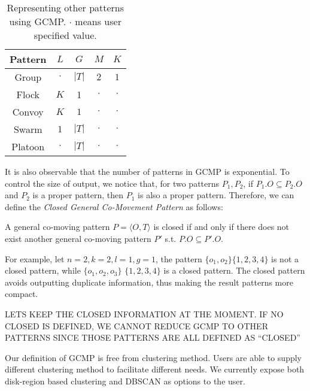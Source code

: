 \begin{table}
\centering
\begin{tabular}{|c|c|c|c|c|}
\hline 
Pattern & $L$ & $G$ & $M$ & $K$ \\ 
\hline
Group & $\cdot$ & $|T|$ & $2$ & $1$ \\
\hline
Flock & $K$ & 1 & $\cdot$ & $\cdot$ \\
\hline 
Convoy & $K$ & $1$ & $\cdot$ & $\cdot$\\ 
\hline 
Swarm & $1$ & $|T|$ & $\cdot$ & $\cdot$ \\ 
\hline 
Platoon & $\cdot$ & $|T|$ & $\cdot$ & $\cdot$\\ 
\hline 
\end{tabular} 
\caption{Representing other patterns using GCMP. $\cdot$ means user specified value.}
\label{tbl:patterns}
\end{table}
 
It is also observable that the number of patterns in GCMP is exponential. To control the size of output, 
we notice that, for two patterns $P_1,P_2$, if $P_1.O \subseteq P_2.O$ and $P_2$ is a proper pattern, then $P_1$ is also a proper pattern. Therefore, we can define the \emph{Closed General Co-Movement Pattern} as follows:

\begin{definition}
A general co-moving pattern $P=\langle O, T \rangle$ is closed if and only if there does not exist another general co-moving pattern $P'$ s.t. $P.O \subseteq P'.O$.
\end{definition}

For example, let $n=2,k=2,l=1,g=1$, the pattern $\{o_1,o_2\}\{1,2,3,4\}$ is not a closed pattern, while $\{o_1,o_2,o_3\}$ $\{1,2,3,4\}$ is a closed pattern. The closed pattern avoids outputting duplicate information, thus making the result patterns more compact. 

LETS KEEP THE CLOSED INFORMATION AT THE MOMENT. IF NO CLOSED IS DEFINED, WE CANNOT REDUCE GCMP TO OTHER PATTERNS SINCE THOSE PATTERNS ARE ALL DEFINED AS ``CLOSED''

Our definition of GCMP is free from clustering method. Users are able to supply different clustering method to facilitate different needs. We currently expose both disk-region based clustering and DBSCAN as options to the user.

